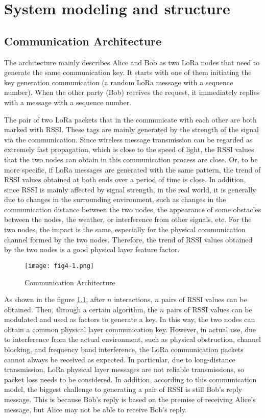 
\chapter{System modeling and structure}

\section{Communication Architecture}

The architecture mainly describes Alice and Bob as two LoRa nodes that need to generate the same communication key. It starts with one of them initiating the key generation communication (a random LoRa message with a sequence number). When the other party (Bob) receives the request, it immediately replies with a message with a sequence number.

The pair of two LoRa packets that in the communicate with each other are both marked with RSSI. These tags are mainly generated by the strength of the signal via the communication. Since wireless message transmission can be regarded as extremely fast propagation, which is close to the speed of light, the RSSI values that the two nodes can obtain in this communication process are close. Or, to be more specific, if LoRa messages are generated with the same pattern, the trend of RSSI values obtained at both ends over a period of time is close.
In addition, since RSSI is mainly affected by signal strength, in the real world, it is generally due to changes in the surrounding environment, such as changes in the communication distance between the two nodes, the appearance of some obstacles between the nodes, the weather, or interference from other signals, etc. For the two nodes, the impact is the same, especially for the physical communication channel formed by the two nodes. Therefore, the trend of RSSI values obtained by the two nodes is a good physical layer feature factor.
\begin{figure}
  \centering
  \texttt{[image: fig4-1.png]}
  \caption{Communication Architecture}
  \label{fig:4-1}
\end{figure}
As shown in the figure \ref{fig:4-1}, after \(n\) interactions, \(n\) pairs of RSSI values can be obtained. Then, through a certain algorithm, the \(n\) pairs of RSSI values can be modulated and used as factors to generate a key. In this way, the two nodes can obtain a common physical layer communication key. 
However, in actual use, due to interference from the actual environment, such as physical obstruction, channel blocking, and frequency band interference, the LoRa communication packets cannot always be received as expected. In particular, due to long-distance transmission, LoRa physical layer messages are not reliable transmissions, so packet loss needs to be considered. In addition, according to this communication model, the biggest challenge to generating a pair of RSSI is still Bob's reply message. This is because Bob's reply is based on the premise of receiving Alice's message, but Alice may not be able to receive Bob's reply.
